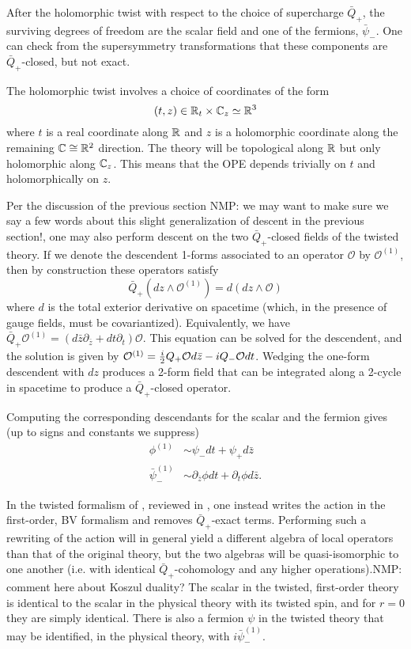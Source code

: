 \documentclass[11pt]{amsart}
\def\natalie#1{{\textcolor{green!65!black}{NMP: {#1}}}}
\begin{document}
After the holomorphic twist with respect to the choice of supercharge $\bar{Q}_+$, the surviving degrees of freedom are the scalar field and one of the fermions, $\bar{\psi}_-$. One can check from the supersymmetry transformations that these components are $\bar{Q}_+$-closed, but not exact. 

The holomorphic twist involves a choice of coordinates of the form
\[
(t , z) \in \mathbb R_t \times \mathbb C_z \simeq \mathbb R^3
\]
where $t$ is a real coordinate along $\mathbb R$ and $z$ is a holomorphic coordinate along the remaining $\mathbb C \cong \mathbb R^2$ direction. 
The theory will be topological along $\mathbb R$ but only holomorphic along $\mathbb C_z$. 
This means that the OPE depends trivially on $t$ and holomorphically on $z$. 

Per the discussion of the previous section \natalie{we may want to make sure we say a few words about this slight generalization of descent in the previous section!}, one may also perform descent on the two $\bar{Q}_+$-closed fields of the twisted theory. If we denote the descendent 1-forms associated to an operator $\mathcal{O}$ by $\mathcal{O}^{(1)}$, then by construction these operators satisfy
\[
\bar{Q}_+(dz \wedge \mathcal{O}^{(1)}) = d (dz \wedge \mathcal{O})
\]
where $d$ is the total exterior derivative on spacetime (which, in the presence of gauge fields, must be covariantized). Equivalently, we have $\bar{Q}_{+}\mathcal{O}^{(1)} = (d\bar{z}\partial_{\bar{z}} + dt \partial_t)\mathcal{O}$. This equation can be solved for the descendent, and the solution is given by $\mathcal{O}^{(1)} = {i \over 2}Q_+ \mathcal{O} d\bar{z} - i Q_- \mathcal{O} dt$. Wedging the one-form descendent with $dz$ produces a 2-form field that can be integrated along a 2-cycle in spacetime to produce a $\bar{Q}_+$-closed operator. 

Computing the corresponding descendants for the scalar and the fermion gives (up to signs and constants we suppress)
\begin{align}
\phi^{(1)} &\sim \psi_{-}dt + \psi_+ d\bar{z} \\
\bar{\psi}_-^{(1)} &\sim \partial_{\bar{z}}\phi dt + \partial_t \phi d\bar{z}.
\end{align}

In the twisted formalism of \cite{ACNV}, reviewed in \cite{CDG}, one instead writes the action in the first-order, BV formalism and removes $\bar{Q}_+$-exact terms. Performing such a rewriting of the action will in general yield a different algebra of local operators than that of the original theory, but the two algebras will be quasi-isomorphic to one another (i.e. with identical $\bar{Q}_+$-cohomology and any higher operations).\natalie{comment here about Koszul duality?}
The scalar in the twisted, first-order theory is identical to the scalar in the physical theory with its twisted spin, and for $r=0$ they are simply identical. There is also a fermion $\psi$ in the twisted theory that may be identified, in the physical theory, with $i \bar{\psi}_-^{(1)}$.
\end{document}

